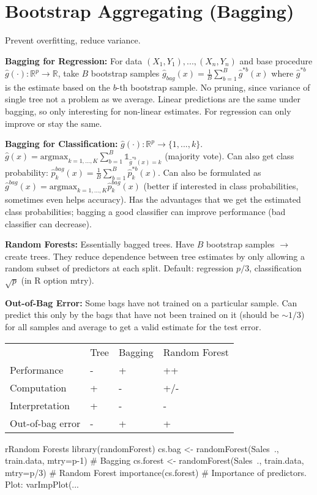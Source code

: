 \section*{Bootstrap Aggregating (Bagging)}
Prevent overfitting, reduce variance.

\textbf{Bagging for Regression:} For data $(X_1,Y_1),...,(X_n,Y_n)$ and base procedure $\hat g(\cdot): \mathbb{R}^p\to \mathbb{R}$, take $B$ bootstrap samples $\hat g_{bag}(x) = \tfrac 1 B \sum_{b=1}^B \hat g^{*b}(x)$ where $\hat g^{*b}$ is the estimate based on the $b$-th bootstrap sample. No pruning, since variance of single tree not a problem as we average. Linear predictions are the same under bagging, so only interesting for non-linear estimates. For regression can only improve or stay the same.

\textbf{Bagging for Classification:}
$\hat g(\cdot): \mathbb{R}^p \to \{1, ..., k\}$. $\hat g (x) = \text{argmax}_{k=1,...,K} \sum_{b=1}^B \mathds{1}_{\hat g^{*b}(x)=k}$ (majority vote).
Can also get class probability: $\hat p_k^{bag}(x) = \tfrac{1}{B} \sum_{b=1}^B \hat p_k^{*b}(x)$.
Can also be formulated as $\hat g^{bag}(x) = \text{argmax}_{k=1,...,K} \hat p_k^{bag}(x)$ (better if interested in class probabilities, sometimes even helps accuracy).
Has the advantages that we get the estimated class probabilities; bagging a good classifier can improve performance (bad classifier can decrease).

\textbf{Random Forests:}
Essentially bagged trees. Have $B$ bootstrap samples $\to$ create trees.
They reduce dependence between tree estimates by only allowing a random subset of predictors at each split.
Default: regression $p/3$, classification $\sqrt{p}$ (in R option mtry).

\textbf{Out-of-Bag Error:}
Some bags have not trained on a particular sample.
Can predict this only by the bags that have not been trained on it (should be $\sim 1/3$) for all samples and average to get a valid estimate for the test error.

\begin{tabular}{llll}
                   & Tree & Bagging & Random Forest \\
  Performance      & -    & +       & ++            \\
  Computation      & +    & -       & +/-           \\
  Interpretation   & +    & -       & -             \\
  Out-of-bag error & -    & +       & +
\end{tabular}%

\begin{codebox}{r}{Random Forests}
  library(randomForest)
  cs.bag <- randomForest(Sales~., train.data, mtry=p-1) # Bagging
  cs.forest <- randomForest(Sales~., train.data, mtry=p/3) # Random Forest
  importance(cs.forest) # Importance of predictors. Plot: varImpPlot(...
\end{codebox}
